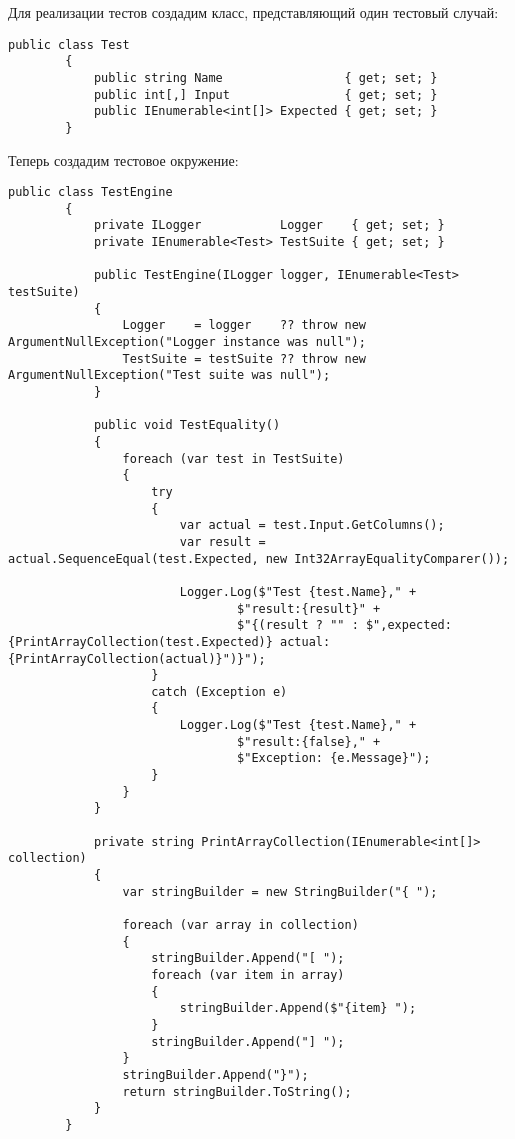 \documentclass[a4paper,14pt]{extarticle}
\begin{document}
    Для реализации тестов создадим класс, представляющий один тестовый случай:

    \begin{lstlisting}[language={[Sharp]C}]
        public class Test
        {
            public string Name                 { get; set; }
            public int[,] Input                { get; set; }
            public IEnumerable<int[]> Expected { get; set; }
        }
    \end{lstlisting}

    Теперь создадим тестовое окружение:

    \begin{lstlisting}[language={[Sharp]C}]
        public class TestEngine
        {
            private ILogger           Logger    { get; set; }
            private IEnumerable<Test> TestSuite { get; set; }

            public TestEngine(ILogger logger, IEnumerable<Test> testSuite)
            {
                Logger    = logger    ?? throw new ArgumentNullException("Logger instance was null");
                TestSuite = testSuite ?? throw new ArgumentNullException("Test suite was null");
            }

            public void TestEquality()
            {
                foreach (var test in TestSuite)
                {
                    try
                    {
                        var actual = test.Input.GetColumns();
                        var result = actual.SequenceEqual(test.Expected, new Int32ArrayEqualityComparer());

                        Logger.Log($"Test {test.Name}," + 
                                $"result:{result}" + 
                                $"{(result ? "" : $",expected: {PrintArrayCollection(test.Expected)} actual:{PrintArrayCollection(actual)}")}");
                    }
                    catch (Exception e)
                    {
                        Logger.Log($"Test {test.Name}," +
                                $"result:{false}," +
                                $"Exception: {e.Message}");
                    }
                }
            }

            private string PrintArrayCollection(IEnumerable<int[]> collection)
            {
                var stringBuilder = new StringBuilder("{ ");

                foreach (var array in collection)
                {
                    stringBuilder.Append("[ ");
                    foreach (var item in array)
                    {
                        stringBuilder.Append($"{item} ");
                    }
                    stringBuilder.Append("] ");
                }
                stringBuilder.Append("}");
                return stringBuilder.ToString();
            }
        }
    \end{lstlisting}
\end{document}
